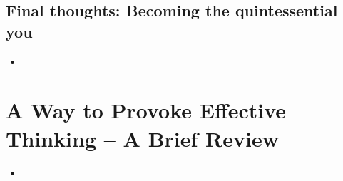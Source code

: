 \documentclass[11pt]{article}
\begin{document}
\subsection{Final thoughts: Becoming the quintessential you}
\begin{itemize}
\item
\end{itemize}


\section{A Way to Provoke Effective Thinking -- A Brief Review}
\begin{itemize}
\item
\end{itemize}

\newpage


\end{document}
